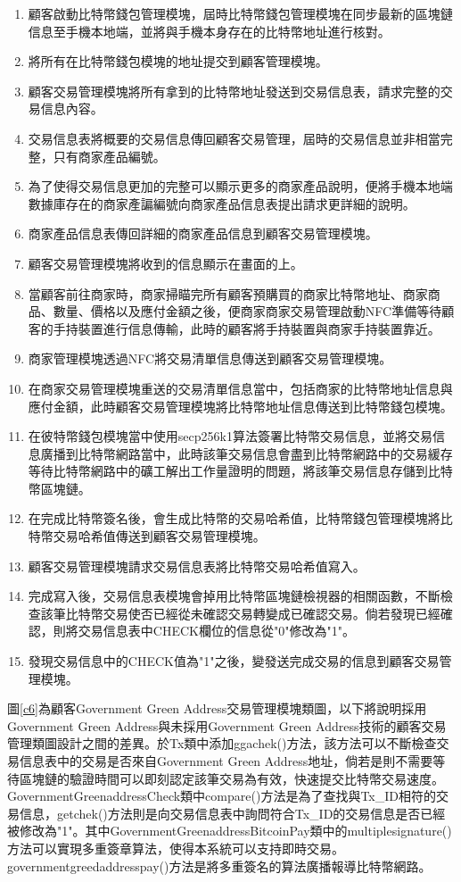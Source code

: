 	\begin{enumerate}
		\item 顧客啟動比特幣錢包管理模塊，屆時比特幣錢包管理模塊在同步最新的區塊鏈信息至手機本地端，並將與手機本身存在的比特幣地址進行核對。
		\item 將所有在比特幣錢包模塊的地址提交到顧客管理模塊。
		\item 顧客交易管理模塊將所有拿到的比特幣地址發送到交易信息表，請求完整的交易信息內容。
		\item 交易信息表將概要的交易信息傳回顧客交易管理，屆時的交易信息並非相當完整，只有商家產品編號。
		\item 為了使得交易信息更加的完整可以顯示更多的商家產品說明，便將手機本地端數據庫存在的商家產諞編號向商家產品信息表提出請求更詳細的說明。
		\item 商家產品信息表傳回詳細的商家產品信息到顧客交易管理模塊。
		\item 顧客交易管理模塊將收到的信息顯示在畫面的上。
		\item 當顧客前往商家時，商家掃瞄完所有顧客預購買的商家比特幣地址、商家商品、數量、價格以及應付金額之後，便商家商家交易管理啟動NFC準備等待顧客的手持裝置進行信息傳輸，此時的顧客將手持裝置與商家手持裝置靠近。
		\item 商家管理模塊透過NFC將交易清單信息傳送到顧客交易管理模塊。
		\item 在商家交易管理模塊重送的交易清單信息當中，包括商家的比特幣地址信息與應付金額，此時顧客交易管理模塊將比特幣地址信息傳送到比特幣錢包模塊。
		\item 在彼特幣錢包模塊當中使用secp256k1算法簽署比特幣交易信息，並將交易信息廣播到比特幣網路當中，此時該筆交易信息會盡到比特幣網路中的交易緩存等待比特幣網路中的礦工解出工作量證明的問題，將該筆交易信息存儲到比特幣區塊鏈。
		\item 在完成比特幣簽名後，會生成比特幣的交易哈希值，比特幣錢包管理模塊將比特幣交易哈希值傳送到顧客交易管理模塊。
		\item 顧客交易管理模塊請求交易信息表將比特幣交易哈希值寫入。
		\item 完成寫入後，交易信息表模塊會掉用比特幣區塊鏈檢視器的相關函數，不斷檢查該筆比特幣交易使否已經從未確認交易轉變成已確認交易。倘若發現已經確認，則將交易信息表中CHECK欄位的信息從"0"修改為"1"。
		\item 發現交易信息中的CHECK值為"1"之後，變發送完成交易的信息到顧客交易管理模塊。
	\end{enumerate}

	圖\ref{c6}為顧客Government Green Address交易管理模塊類圖，以下將說明採用Government Green Address與未採用Government Green Address技術的顧客交易管理類圖設計之間的差異。於Tx類中添加ggachek()方法，該方法可以不斷檢查交易信息表中的交易是否來自Government Green Address地址，倘若是則不需要等待區塊鏈的驗證時間可以即刻認定該筆交易為有效，快速提交比特幣交易速度。GovernmentGreenaddressCheck類中compare()方法是為了查找與Tx\_ID相符的交易信息，getchek()方法則是向交易信息表中詢問符合Tx\_ID的交易信息是否已經被修改為"1"。其中GovernmentGreenaddressBitcoinPay類中的multiplesignature()方法可以實現多重簽章算法，使得本系統可以支持即時交易。governmentgreedaddresspay()方法是將多重簽名的算法廣播報導比特幣網路。


